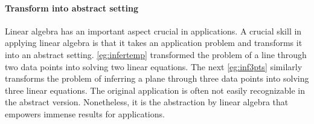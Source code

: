 \paragraph{Transform into abstract setting}
Linear algebra has an important aspect crucial in applications.
A crucial skill in applying linear algebra is that it takes an application problem and transforms it into an abstract setting.
\autoref{eg:infertemp} transformed the problem of  a line through two data points into solving two linear equations.
The next \autoref{eg:inf3pts} similarly transforms the problem of inferring a plane through three data points into solving three linear equations.
The original application is often not easily recognizable in the abstract version. 
Nonetheless, it is the abstraction by linear algebra that empowers immense results for applications.


